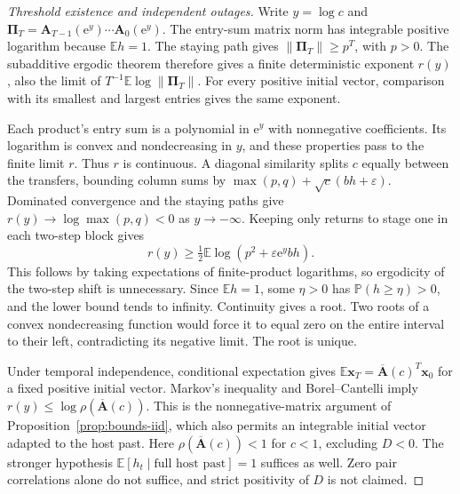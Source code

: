 \begin{proof}[Threshold existence and independent outages]
Write \(y=\log c\) and \(\mathbf\Pi_T=\mathbf A_{T-1}(\mathrm e^y)\cdots\mathbf A_0(\mathrm e^y)\). The entry-sum matrix norm has integrable positive logarithm because \(\mathbb E h=1\). The staying path gives \(\|\mathbf\Pi_T\|\geq p^T\), with \(p>0\). The subadditive ergodic theorem therefore gives a finite deterministic exponent \(r(y)\), also the limit of \(T^{-1}\mathbb E\log\|\mathbf\Pi_T\|\). For every positive initial vector, comparison with its smallest and largest entries gives the same exponent.

Each product's entry sum is a polynomial in \(\mathrm e^y\) with nonnegative coefficients. Its logarithm is convex and nondecreasing in \(y\), and these properties pass to the finite limit \(r\). Thus \(r\) is continuous. A diagonal similarity splits \(c\) equally between the transfers, bounding column sums by \(\max(p,q)+\sqrt c(bh+\varepsilon)\). Dominated convergence and the staying paths give \(r(y)\to\log\max(p,q)<0\) as \(y\to-\infty\). Keeping only returns to stage one in each two-step block gives
\begin{equation}\label{eq:mech-outage-existence}
 r(y)\geq\tfrac12\mathbb E\log(p^2+\varepsilon\mathrm e^y b h).
\end{equation}
This follows by taking expectations of finite-product logarithms, so ergodicity of the two-step shift is unnecessary. Since \(\mathbb E h=1\), some \(\eta>0\) has \(\mathbb P(h\geq\eta)>0\), and the lower bound tends to infinity. Continuity gives a root. Two roots of a convex nondecreasing function would force it to equal zero on the entire interval to their left, contradicting its negative limit. The root is unique.

Under temporal independence, conditional expectation gives \(\mathbb E\mathbf x_T=\overline{\mathbf A}(c)^T\mathbf x_0\) for a fixed positive initial vector. Markov's inequality and Borel--Cantelli imply \(r(y)\leq\log\rho(\overline{\mathbf A}(c))\). This is the nonnegative-matrix argument of Proposition~\ref{prop:bounds-iid}, which also permits an integrable initial vector adapted to the host past. Here \(\rho(\overline{\mathbf A}(c))<1\) for \(c<1\), excluding \(D<0\). The stronger hypothesis \(\mathbb E[h_t\mid\text{full host past}]=1\) suffices as well. Zero pair correlations alone do not suffice, and strict positivity of \(D\) is not claimed.
\end{proof}

